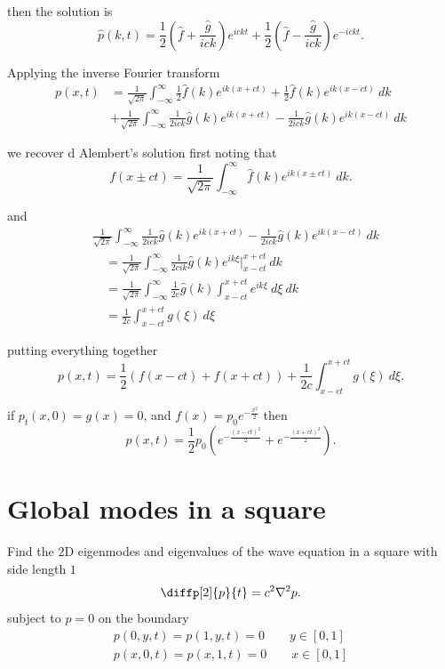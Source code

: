 then the solution is
\[
  \hat{p}(k,t) = \frac{1}{2} \left(\hat{f}+ \frac{\hat{g}}{ick}\right)e^{ickt}
  + \frac{1}{2} \left(\hat{f}- \frac{\hat{g}}{ick}\right)e^{-ickt}
.\] 

Applying the inverse Fourier transform
\begin{align*}
    p(x,t) &= \frac{1}{\sqrt{2\pi }} \int_{-\infty }^{\infty
  } {\frac{1}{2}\hat{f}(k)e^{ik (x+ct)} + \frac{1}{2}\hat{f}(k)e^{ik (x-ct)}}
  \: d{k} \\
  &+ \frac{1}{\sqrt{2\pi }} \int_{-\infty }^{\infty
  } {\frac{1}{2ick}\hat{g}(k)e^{ik (x+ct)} - \frac{1}{2ick}\hat{g}(k)e^{ik (x-ct)}}
  \: d{k}
\end{align*}

we recover d Alembert's solution first noting that
\[
  f(x \pm ct) = \frac{1}{\sqrt{2\pi }} \int_{-\infty }^{\infty
  } {\hat{f}(k)e^{ik (x\pm ct)}} \: d{k} 
.\] 

and
\begin{align*}
  &\frac{1}{\sqrt{2\pi }} \int_{-\infty }^{\infty
  } {\frac{1}{2ick}\hat{g}(k)e^{ik (x+ct)} - \frac{1}{2ick}\hat{g}(k)e^{ik (x-ct)}}
  \: d{k} \\
  & \quad = \frac{1}{\sqrt{2\pi }} \int_{-\infty }^{\infty}
  {\frac{1}{2cik}\hat{g}(k) e^{ik\xi}\biggr|_{x-ct}^{x+ct}} \: d{k} \\
  & \quad = \frac{1}{\sqrt{2\pi }} \int_{-\infty }^{\infty
  } {\frac{1}{2c}\hat{g}(k) \int_{x-ct}^{x+ct} {e^{ik\xi}} \: d{\xi} 
  } \: d{k} \\
  & \quad = \frac{1}{2c} \int_{x-ct}^{x+ct} {g(\xi)} \: d{\xi} 
\end{align*}

putting everything together
\[
  p(x,t) = \frac{1}{2} \left(f(x-ct) + f(x+ct)\right) + \frac{1}{2c} \int_{x-ct}^{x+ct} {g(\xi)} \: d{\xi} 
.\] 

if $p_{t}(x,0) = g(x) = 0$, and $f(x) = p_0 e^{-\frac{x^2}{2}}$ then
\[
  \boxed{p(x,t) = \frac{1}{2}p_0 \left(e^{-\frac{(x-ct)^2}{2}} + e^{-\frac{(x+ct)^2}{2}}\right)}
.\] 

\section{Global modes in a square}%
\label{sec:3}

Find the $2$D eigenmodes and eigenvalues of the wave equation in a square with
side length $1$ 
  \[
  \diffp[2]{p}{t} = c^2\nabla ^2p
  .\] 
subject to $p=0$ on the boundary
\begin{align*}
  p(0,y,t) = p(1,y,t) = 0 \qquad y\in [0,1] \\
  p(x,0,t) = p(x,1,t) = 0 \qquad x\in [0,1]
\end{align*}

